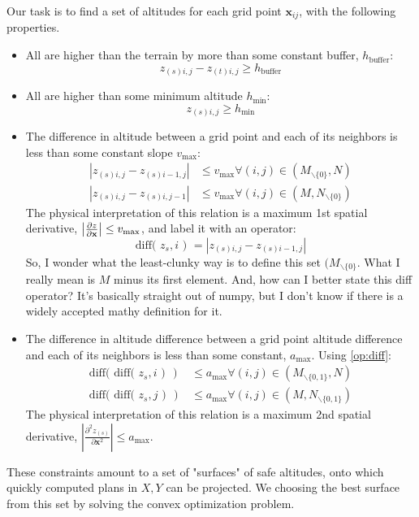 \documentclass[letterpaper, 12pt]{article}
\def\xij{\mathbf{x}_{ij}}
\def\zsij{z_{(s) i,j}}
\def\ztij{z_{(t) i,j}}
\newcommand{\mls}[1]{\color{teal}#1}
\newcommand{\diff}[1]{\text{diff( }#1\text{ ) }}
\begin{document}
Our task is to find a set of altitudes for each grid point $\xij$, with the following properties. 
\begin{itemize}
\item{All are higher than the terrain by more than some constant buffer, $h_{\text{buffer}}$:
\begin{equation}
\zsij - \ztij \geq h_{\text{buffer}}
\label{eq:buffer}
\end{equation}
}
\item{All are higher than some minimum altitude $h_{\text{min}}$:
\begin{equation}
\zsij \geq h_{\text{min}}
\label{eq:altmin}
\end{equation}
}
\item{The difference in altitude between a grid point and each of its neighbors is less than some constant slope $v_{\text{max}}$:
\begin{equation}
\begin{aligned}
    | \zsij - z_{(s) i-1, j} | &\leq v_{\text{max}} \forall (i, j) \in (M_{\backslash  \{0\}}, N) \\
    | \zsij - z_{(s) i, j-1} | &\leq v_{\text{max}} \forall (i, j) \in (M, N_{\backslash  \{0\}})
\end{aligned}
\label{eq:slope}
\end{equation}
The physical interpretation of this relation is a maximum 1st spatial derivative, $\left|\pdv{z}{ \mathbf{x} } \right| \leq v_{\text{max}}$, and label it with an operator:
\begin{equation}
    \diff{z_s, i} = | \zsij - z_{(s) i-1, j} |
    \label{op:diff}
\end{equation}
\mls{So, I wonder what the least-clunky way is to define this set $(M_{\backslash  \{0\}}$. What I really mean is $M$ minus its first element. And, how can I better state this diff operator? It's basically straight out of numpy, but I don't know if there is a widely accepted mathy definition for it.}
}
\item {The difference in altitude difference between a grid point altitude difference and each of its neighbors is less than some constant, $a_{\text{max}}$. Using \cref{op:diff}:
\begin{equation}
    \begin{aligned}
        \diff{\diff{ z_s, i}} &\leq a_{\text{max}} \forall (i, j) \in (M_{\backslash  \{0, 1\}}, N) \\
        \diff{\diff{ z_s, j}} &\leq a_{\text{max}} \forall (i, j) \in (M, N_{\backslash  \{0, 1\}})
    \end{aligned}
    \label{eq:acceleration}
\end{equation}
The physical interpretation of this relation is a maximum 2nd spatial derivative, $\left| \frac{\partial^2 z_{(s)}}{\partial \mathbf{x}^2} \right| \leq a_{\text{max}}$.
}
\end{itemize}
These constraints amount to a set of "surfaces" of safe altitudes, onto which quickly computed plans in $X,Y$ can be projected. We choosing the best surface from this set by solving the convex optimization problem.
\end{document}
